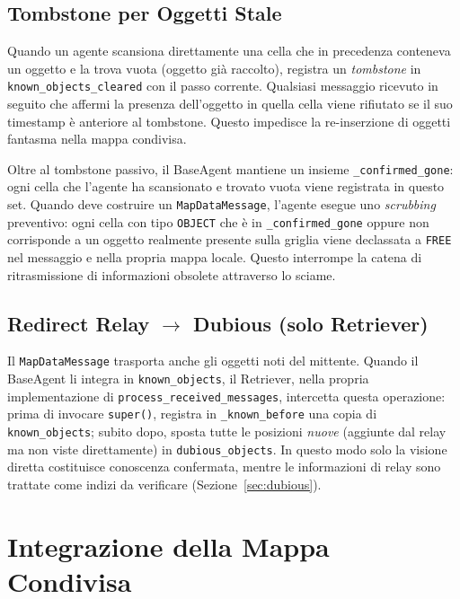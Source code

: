 \subsection{Tombstone per Oggetti Stale}

Quando un agente scansiona direttamente una cella che in precedenza conteneva un oggetto e
la trova vuota (oggetto già raccolto), registra un \textit{tombstone} in
\texttt{known\_objects\_cleared} con il passo corrente. Qualsiasi messaggio ricevuto in
seguito che affermi la presenza dell'oggetto in quella cella viene rifiutato se il suo
timestamp \`e anteriore al tombstone. Questo impedisce la re-inserzione di oggetti fantasma
nella mappa condivisa.

Oltre al tombstone passivo, il BaseAgent mantiene un insieme \texttt{\_confirmed\_gone}:
ogni cella che l'agente ha scansionato e trovato vuota viene registrata in questo set.
Quando deve costruire un \texttt{MapDataMessage}, l'agente esegue uno \textit{scrubbing}
preventivo: ogni cella con tipo \texttt{OBJECT} che \`e in \texttt{\_confirmed\_gone}
oppure non corrisponde a un oggetto realmente presente sulla griglia viene declassata a
\texttt{FREE} nel messaggio e nella propria mappa locale. Questo interrompe la catena di
ritrasmissione di informazioni obsolete attraverso lo sciame.

\subsection{Redirect Relay \texorpdfstring{$\to$}{->} Dubious (solo Retriever)}

Il \texttt{MapDataMessage} trasporta anche gli oggetti noti del mittente. Quando il
BaseAgent li integra in \texttt{known\_objects}, il Retriever, nella propria
implementazione di \texttt{process\_received\_messages}, intercetta questa operazione:
prima di invocare \texttt{super()}, registra in \texttt{\_known\_before}
una copia di \texttt{known\_objects};
subito dopo, sposta tutte le posizioni \textit{nuove} (aggiunte dal relay ma non viste
direttamente) in \texttt{dubious\_objects}.  In questo modo solo la visione diretta
costituisce conoscenza confermata, mentre le informazioni di relay sono trattate come
indizi da verificare (Sezione~\ref{sec:dubious}).

\section{Integrazione della Mappa Condivisa}

